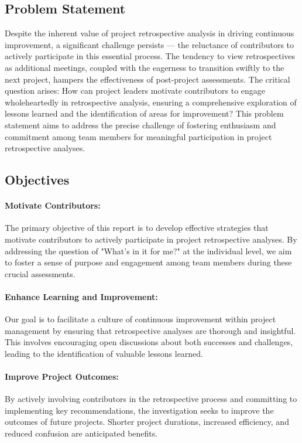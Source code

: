\documentclass{article}
\begin{document}
\subsection{Problem Statement}
Despite the inherent value of project retrospective analysis in driving continuous improvement, a significant challenge persists — the reluctance of contributors to actively participate in this essential process. The tendency to view retrospectives as additional meetings, coupled with the eagerness to transition swiftly to the next project, hampers the effectiveness of post-project assessments. The critical question arises: How can project leaders motivate contributors to engage wholeheartedly in retrospective analysis, ensuring a comprehensive exploration of lessons learned and the identification of areas for improvement? This problem statement aims to address the precise challenge of fostering enthusiasm and commitment among team members for meaningful participation in project retrospective analyses.

\newpage

\subsection{Objectives}
\paragraph*{Motivate Contributors:}
The primary objective of this report is to develop effective strategies that motivate contributors to actively participate in project retrospective analyses. By addressing the question of "What’s in it for me?" at the individual level, we aim to foster a sense of purpose and engagement among team members during these crucial assessments.

\paragraph*{Enhance Learning and Improvement:} Our goal is to facilitate a culture of continuous improvement within project management by ensuring that retrospective analyses are thorough and insightful. This involves encouraging open discussions about both successes and challenges, leading to the identification of valuable lessons learned. \cite{nelson2021project}

\paragraph*{Improve Project Outcomes:} By actively involving contributors in the retrospective process and committing to implementing key recommendations, the investigation seeks to improve the outcomes of future projects. Shorter project durations, increased efficiency, and reduced confusion are anticipated benefits.
    
\end{document}
